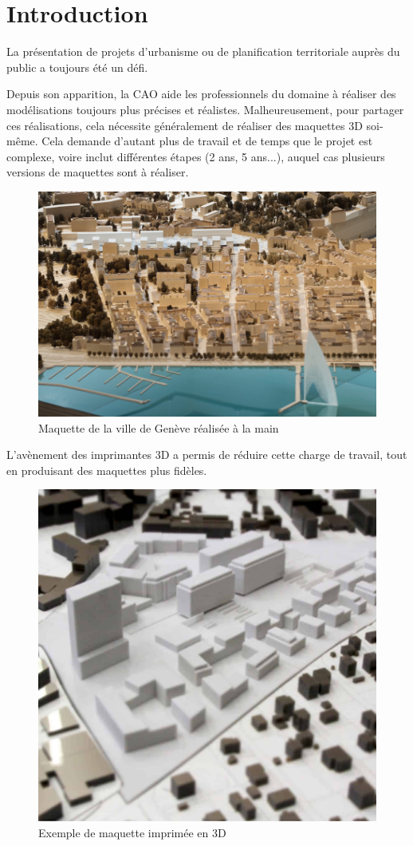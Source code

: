 \chapter{Introduction}

\label{Chapter1} %

La présentation de projets d'urbanisme ou de planification territoriale auprès du public a toujours été un défi. 

Depuis son apparition, la CAO aide les professionnels du domaine à réaliser des modélisations toujours plus précises et réalistes. 
Malheureusement, pour partager ces réalisations, cela nécessite généralement de réaliser des maquettes 3D soi-même. Cela demande d'autant plus de travail et de temps que le projet est complexe, voire inclut différentes étapes (2 ans, 5 ans...), auquel cas plusieurs versions de maquettes sont à réaliser.

\begin{figure}[h]
    \centering
    \includegraphics[width=0.8\linewidth]{Figures/geneva-model.png}
    \caption{Maquette de la ville de Genève réalisée à la main}
    \label{fig:geneva-model}
\end{figure}

L'avènement des imprimantes 3D a permis de réduire cette charge de travail, tout en produisant des maquettes plus fidèles. 


\begin{figure}[h]
    \centering
    \includegraphics[width=0.5\linewidth]{Figures/3dprinted-model.jpg}
    \caption{Exemple de maquette imprimée en 3D}
    \label{fig:3dprinted-model}
\end{figure}


